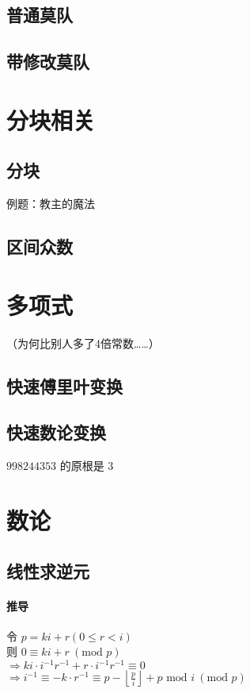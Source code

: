 \documentclass{article}
\begin{document}
		\subsection{普通莫队}
		\subsection{带修改莫队}

	\newpage

	\section{分块相关}
		\subsection{分块}
		例题：教主的魔法
		
		\subsection{区间众数}

	\newpage
	\section{多项式}
		（为何比别人多了4倍常数……）
		\subsection{快速傅里叶变换}
		
		\subsection{快速数论变换}
		$998244353$ 的原根是 $3$
		
	\section{数论}
		\subsection{线性求逆元}
			\paragraph{推导}
			令 $p = ki + r (0 \le r < i)$ \\
			则 $0 \equiv ki + r \: (\text{mod } p)$ \\
			$\Rightarrow ki \cdot i^{-1} r^{-1} + r \cdot i^{-1} r^{-1} \equiv 0$ \\
			$\Rightarrow i^{-1} \equiv -k \cdot r^{-1} \equiv p - \left\lfloor \frac{p}{i}\right\rfloor + p \text{ mod } i \: ( \text{mod } p )$
			
\end{document}
